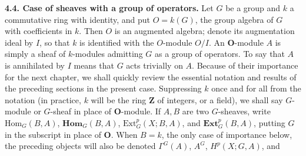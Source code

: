 \textbf{4.4. Case of sheaves with a group of operators.}
Let $G$ be a group and $k$ a commutative ring with identity, and put
$O=k(G)$, the group algebra of $G$ with coefficients in $k$. Then $O$ is an
augmented algebra; denote its augmentation ideal by $I$, so that $k$ is
identified with the $O$-module $O/I$. An $\mathbf O$-module $A$ is simply a sheaf of
$k$-modules admitting $G$ as a group of operators. To say that $A$ is
annihilated by $I$ means that $G$ acts trivially on $A$. Because of their
importance for the next chapter, we shall quickly review the essential
notation and results of the preceding sections in the present case.
Suppressing $k$ once and for all from the notation (in practice, $k$ will be
the ring $\mathbf Z$ of integers, or a field), we shall say $G$-module or
$G$-sheaf in place of $\mathbf O$-module. If $A,B$ are two $G$-sheaves, write
$\mathrm{Hom}_G(B,A)$, $\mathbf{Hom}_G(B,A)$,
$\mathrm{Ext}_G^p(X;B,A)$, and $\mathbf{Ext}_G^p(B,A)$, putting $G$ in the
subscript in place of $\mathbf O$. When $B=k$, the only case of importance below,
the preceding objects will also be denoted $\Gamma^G(A)$, $A^G$,
$H^p(X;G,A)$, and


